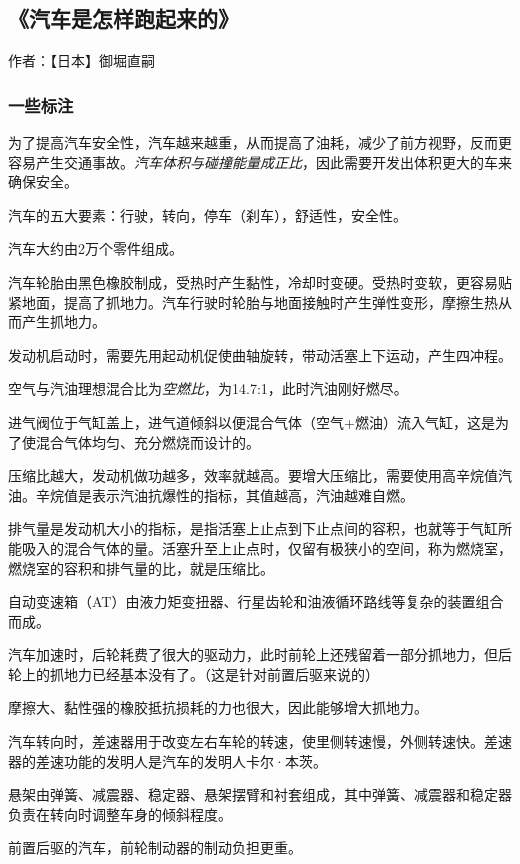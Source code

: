 \subsection{《汽车是怎样跑起来的》}

作者：【日本】御堀直嗣

\subsubsection{一些标注}

为了提高汽车安全性，汽车越来越重，从而提高了油耗，减少了前方视野，反而更容易产生交通事故。\emph{汽车体积与碰撞能量成正比}，因此需要开发出体积更大的车来确保安全。

汽车的五大要素：行驶，转向，停车（刹车），舒适性，安全性。

汽车大约由2万个零件组成。

汽车轮胎由黑色橡胶制成，受热时产生黏性，冷却时变硬。受热时变软，更容易贴紧地面，提高了抓地力。汽车行驶时轮胎与地面接触时产生弹性变形，摩擦生热从而产生抓地力。

发动机启动时，需要先用起动机促使曲轴旋转，带动活塞上下运动，产生四冲程。

空气与汽油理想混合比为\emph{空燃比}，为14.7:1，此时汽油刚好燃尽。

进气阀位于气缸盖上，进气道倾斜以便混合气体（空气+燃油）流入气缸，这是为了使混合气体均匀、充分燃烧而设计的。

压缩比越大，发动机做功越多，效率就越高。要增大压缩比，需要使用高辛烷值汽油。辛烷值是表示汽油抗爆性的指标，其值越高，汽油越难自燃。

排气量是发动机大小的指标，是指活塞上止点到下止点间的容积，也就等于气缸所能吸入的混合气体的量。活塞升至上止点时，仅留有极狭小的空间，称为燃烧室，燃烧室的容积和排气量的比，就是压缩比。

自动变速箱（AT）由液力矩变扭器、行星齿轮和油液循环路线等复杂的装置组合而成。

汽车加速时，后轮耗费了很大的驱动力，此时前轮上还残留着一部分抓地力，但后轮上的抓地力已经基本没有了。（这是针对前置后驱来说的）

摩擦大、黏性强的橡胶抵抗损耗的力也很大，因此能够增大抓地力。

汽车转向时，差速器用于改变左右车轮的转速，使里侧转速慢，外侧转速快。差速器的差速功能的发明人是汽车的发明人卡尔·本茨。

悬架由弹簧、减震器、稳定器、悬架摆臂和衬套组成，其中弹簧、减震器和稳定器负责在转向时调整车身的倾斜程度。

前置后驱的汽车，前轮制动器的制动负担更重。

